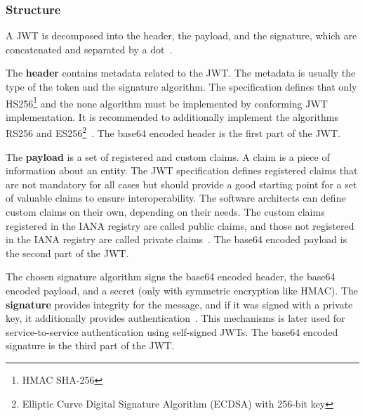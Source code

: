 \subsubsection{Structure}
A JWT is decomposed into the header, the payload, and the signature, which are concatenated and separated by a dot~\cite{jwtdocauth0}.

The \textbf{header} contains metadata related to the JWT. 
The metadata is usually the type of the token and the signature algorithm.
The specification defines that only HS256\footnote{HMAC SHA-256} and the none algorithm must be implemented by conforming JWT implementation.
It is recommended to additionally implement the algorithms RS256 and ES256\footnote{Elliptic Curve Digital Signature Algorithm (ECDSA) with 256-bit key}~\cite{jwtdocauth0, jwtrfc}.
The base64 encoded header is the first part of the JWT.

The \textbf{payload} is a set of registered and custom claims.
A claim is a piece of information about an entity.
The JWT specification defines registered claims that are not mandatory for all cases but should provide a good starting point for a set of valuable claims to ensure interoperability.
The software architects can define custom claims on their own, depending on their needs.
The custom claims registered in the IANA registry are called public claims, and those not registered in the IANA registry are called private claims~\cite{jwtdocauth0, jwtrfc}.
The base64 encoded payload is the second part of the JWT.

The chosen signature algorithm signs the base64 encoded header, the base64 encoded payload, and a secret (only with symmetric encryption like HMAC).
The \textbf{signature} provides integrity for the message, and if it was signed with a private key, it additionally provides authentication~\cite{jwtdocauth0}.
This mechanisms is later used for service-to-service authentication using self-signed JWTs.
The base64 encoded signature is the third part of the JWT.

